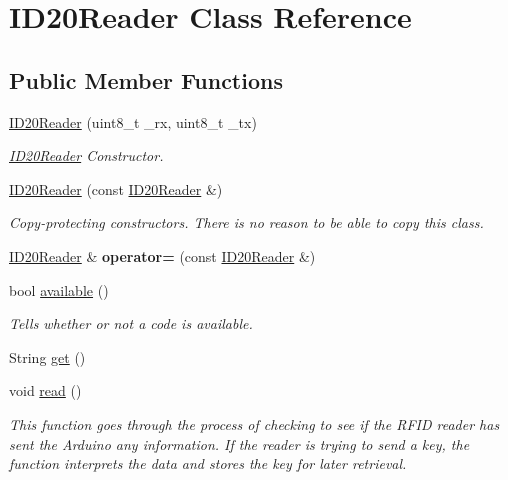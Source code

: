 \hypertarget{class_i_d20_reader}{\section{I\-D20\-Reader Class Reference}
\label{class_i_d20_reader}
}
\subsection*{Public Member Functions}
\begin{DoxyCompactItemize}
\item 
\hyperlink{class_i_d20_reader_ac0b535d8bf02e348a14f14b5c69a587a}{I\-D20\-Reader} (uint8\-\_\-t \-\_\-rx, uint8\-\_\-t \-\_\-tx)
\begin{DoxyCompactList}\small\item\em \hyperlink{class_i_d20_reader}{I\-D20\-Reader} Constructor. \end{DoxyCompactList}\item 
\hypertarget{class_i_d20_reader_aaeecf0e983f085e3b8fbf1a5ad12218a}{\hyperlink{class_i_d20_reader_aaeecf0e983f085e3b8fbf1a5ad12218a}{I\-D20\-Reader} (const \hyperlink{class_i_d20_reader}{I\-D20\-Reader} \&)}\label{class_i_d20_reader_aaeecf0e983f085e3b8fbf1a5ad12218a}

\begin{DoxyCompactList}\small\item\em Copy-\/protecting constructors. There is no reason to be able to copy this class. \end{DoxyCompactList}\item 
\hypertarget{class_i_d20_reader_ad7f2bc01b67d689ed34eda6cd9d106e9}{\hyperlink{class_i_d20_reader}{I\-D20\-Reader} \& {\bfseries operator=} (const \hyperlink{class_i_d20_reader}{I\-D20\-Reader} \&)}\label{class_i_d20_reader_ad7f2bc01b67d689ed34eda6cd9d106e9}

\item 
bool \hyperlink{class_i_d20_reader_af6685ddc8c2c5c5c49993bcd6b40e85c}{available} ()
\begin{DoxyCompactList}\small\item\em Tells whether or not a code is available. \end{DoxyCompactList}\item 
String \hyperlink{class_i_d20_reader_a1a7c4b0e2e5e0ce46a76a9e17b958e5c}{get} ()
\item 
void \hyperlink{class_i_d20_reader_ab147baa6dfa6c4ee37bb8d96bb36f854}{read} ()
\begin{DoxyCompactList}\small\item\em This function goes through the process of checking to see if the R\-F\-I\-D reader has sent the Arduino any information. If the reader is trying to send a key, the function interprets the data and stores the key for later retrieval. \end{DoxyCompactList}\end{DoxyCompactItemize}


